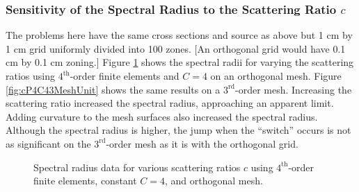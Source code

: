 \documentclass[12pt]{article}
\begin{document}
\subsubsection{Sensitivity of the Spectral Radius to the Scattering Ratio $c$}
The problems here have the same cross sections and source as above but 1 cm by 1 cm grid uniformly divided into 100 zones. [An orthogonal grid would have 0.1 cm by 0.1 cm zoning.] Figure \ref{fig:cP4C4OrthoUnit} shows the spectral radii for varying the scattering ratios using $4^\text{th}$-order finite elements and $C=4$ on an orthogonal mesh. Figure \ref{fig:cP4C43MeshUnit} shows the same results on a $3^\text{rd}$-order mesh. Increasing the scattering ratio increased the spectral radius, approaching an apparent limit. Adding curvature to the mesh surfaces also increased the spectral radius. Although the spectral radius is higher, the jump when the ``switch'' occurs is not as significant on the $3^\text{rd}$-order mesh as it is with the orthogonal grid.

\begin{figure}[!htb]
\centering
{}
\caption{Spectral radius data for various scattering ratios $c$ using $4^\text{th}$-order finite elements, constant $C=4$, and orthogonal mesh.}
\label{fig:cP4C4OrthoUnit}
\end{figure}
\end{document}
